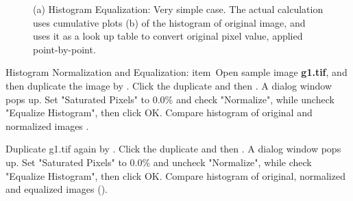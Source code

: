 \begin{figure}[H]
 \centering
 \caption{ (a) Histogram Equalization: Very simple case.
The actual calculation uses cumulative plots (b) of the histogram of original
image, and uses it as a look up table to convert original pixel value,
applied point-by-point. }
 \label{fig:equalizationSimple}
\end{figure}

\begin{indentexercise}{2}
Histogram Normalization and Equalization:
item\ Open sample image \textbf{g1.tif}, and then duplicate the image by . Click the duplicate and then . A dialog
window pops up. Set "Saturated Pixels" to 0.0\% and check "Normalize", while uncheck "Equalize Histogram", then click OK.
Compare histogram of original and normalized images .  

\item Duplicate g1.tif again by . Click the
duplicate and then . A dialog window pops up. Set "Saturated
Pixels" to 0.0\% and uncheck "Normalize", while check "Equalize Histogram", then click OK.
Compare histogram of original, normalized and equalized images
().

\end{indentexercise}

